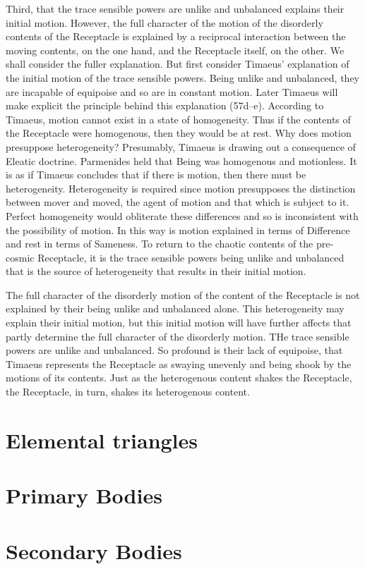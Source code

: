 Third, that the trace sensible powers are unlike and unbalanced explains their initial motion. However, the full character of the motion of the disorderly contents of the Receptacle is explained by a reciprocal interaction between the moving contents, on the one hand, and the Receptacle itself, on the other. We shall consider the fuller explanation. But first consider Timaeus' explanation of the initial motion of the trace sensible powers. Being unlike and unbalanced, they are incapable of equipoise and so are in constant motion. Later Timaeus will make explicit the principle behind this explanation (57d--e). According to Timaeus, motion cannot exist in a state of homogeneity. Thus if the contents of the Receptacle were homogenous, then they would be at rest. Why does motion presuppose heterogeneity? Presumably, Timaeus is drawing out a consequence of Eleatic doctrine. Parmenides held that Being was homogenous and motionless. It is as if Timaeus concludes that if there is motion, then there must be heterogeneity. Heterogeneity is required since motion presupposes the distinction between mover and moved, the agent of motion and that which is subject to it. Perfect homogeneity would obliterate these differences and so is inconsistent with the possibility of motion. In this way is motion explained in terms of Difference and rest in terms of Sameness. To return to the chaotic contents of the pre-cosmic Receptacle, it is the trace sensible powers being unlike and unbalanced that is the source of heterogeneity that results in their initial motion.

The full character of the disorderly motion of the content of the Receptacle is not explained by their being unlike and unbalanced alone. This heterogeneity may explain their initial motion, but this initial motion will have further affects that partly determine the full character of the disorderly motion. THe trace sensible powers are unlike and unbalanced. So profound is their lack of equipoise, that Timaeus represents the Receptacle as swaying unevenly and being shook by the motions of its contents. Just as the heterogenous content shakes the Receptacle, the Receptacle, in turn, shakes its heterogenous content. 



\section{Elemental triangles} %
\label{sec:elemental_triangles}




\section{Primary Bodies} %
\label{sec:primary_bodies}




\section{Secondary Bodies} %
\label{sec:secondary_bodies}




